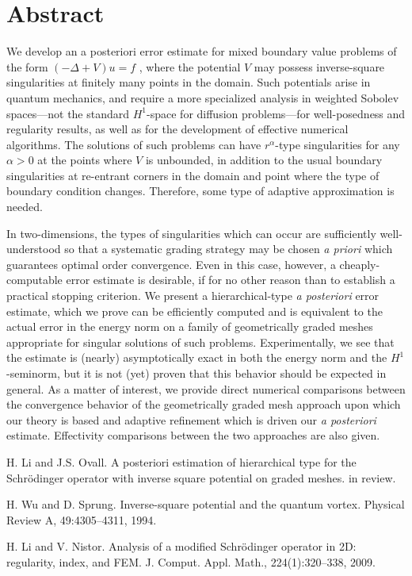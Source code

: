 \documentclass[article,A4,11pt]{llncs}%
\begin{document}
\section*{Abstract}

We develop an a posteriori error estimate for mixed boundary value problems of the form $(-\Delta + V )u = f$ , where the potential $V$ may possess inverse-square singularities at finitely many points in the domain. Such potentials arise in quantum mechanics, and require
a more specialized analysis in weighted Sobolev spaces---not the standard $H^1$-space for diffusion problems---for well-posedness and regularity results, as well as for the 
development of effective numerical algorithms.  The solutions of such problems can have
$r^{\alpha}$-type singularities for any $\alpha>0$ at the points where $V$ is unbounded,
in addition to the usual boundary singularities at re-entrant corners in the domain and
point where the type of boundary condition changes.  Therefore, some type of adaptive approximation is needed.  

In two-dimensions, the types of singularities which can occur are sufficiently well-understood so that a systematic grading strategy may be chosen \textit{a priori} which guarantees optimal order convergence.  Even in this case, however, a cheaply-computable error estimate is desirable, if for no other reason than to establish a practical stopping criterion.  We present a hierarchical-type \textit{a posteriori} error estimate, which we prove can be efficiently computed and is equivalent to the actual error in the energy norm on a family of geometrically graded meshes appropriate for singular solutions of such problems.  Experimentally, we see that the estimate is (nearly) asymptotically exact in both the energy norm and the $H^1$-seminorm, but it is not (yet) proven that this behavior should be expected in general.  As a matter of interest, we provide direct numerical comparisons between the convergence behavior of the geometrically graded mesh approach upon which our theory is based and adaptive refinement which is driven our \textit{a posteriori} estimate.  Effectivity comparisons between the two approaches are also given.





\begin{thebibliography}{10}
{\sc H. Li and J.S. Ovall}. {A posteriori estimation of hierarchical type for the  Schr\"odinger operator with inverse square potential on graded meshes}. in review.

{\sc H. Wu and D. Sprung}. {Inverse-square potential and the quantum vortex}. Physical Review A,  49:4305–4311, 1994.

{\sc H. Li and V. Nistor}. {Analysis of a modified Schr\"odinger operator in 2D: regularity, index,  and FEM}. J. Comput. Appl. Math., 224(1):320–338, 2009.
\end{thebibliography}
\end{document}
